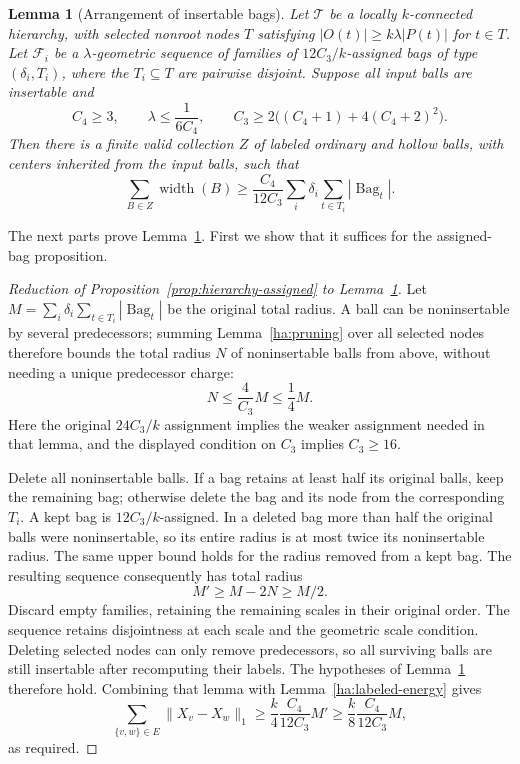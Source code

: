 \documentclass[11pt]{amsart}
\newtheorem{lemma}[theorem]{Lemma}
\theoremstyle{definition}
\theoremstyle{remark}
\numberwithin{equation}{section}
\begin{document}
\begin{lemma}[Arrangement of insertable bags]\label{ha:insertable-arrangement}
Let $\mathcal T$ be a locally $k$-connected hierarchy, with selected
nonroot nodes $T$ satisfying $|O(t)|\ge k\lambda|P(t)|$ for $t\in T$.
Let $\mathcal F_i$ be a $\lambda$-geometric sequence of families
of $12C_3/k$-assigned bags of type $(\delta_i,T_i)$, where the
$T_i\subseteq T$ are pairwise disjoint.  Suppose all input balls are
insertable and
\[
 C_4\ge3,\qquad \lambda\le\frac{1}{6C_4},\qquad
 C_3\ge2\bigl((C_4+1)+4(C_4+2)^2\bigr).
\]
Then there is a finite valid collection $Z$ of labeled ordinary and
hollow balls, with centers inherited from the input balls, such that
\begin{equation}\label{ha:arrangement-width}
 \sum_{B\in Z}\operatorname{width}(B)
 \ge \frac{C_4}{12C_3}
       \sum_i\delta_i\sum_{t\in T_i}|\operatorname{Bag}_t|.
\end{equation}
\end{lemma}

The next parts prove Lemma~\ref{ha:insertable-arrangement}.  First we
show that it suffices for the assigned-bag proposition.

\begin{proof}[Reduction of Proposition~\ref{prop:hierarchy-assigned}
to Lemma~\ref{ha:insertable-arrangement}]
Let
$M=\sum_i\delta_i\sum_{t\in T_i}|\operatorname{Bag}_t|$
be the original total radius.  A ball can be noninsertable by several
predecessors; summing Lemma~\ref{ha:pruning} over all selected nodes
therefore bounds the total radius $N$ of noninsertable balls from
above, without needing a unique predecessor charge:
\begin{equation}\label{ha:preprocess-mass}
 N\le\frac{4}{C_3}M\le\frac14M.
\end{equation}
Here the original $24C_3/k$ assignment implies the weaker assignment
needed in that lemma, and the displayed condition on $C_3$ implies
$C_3\ge16$.

Delete all noninsertable balls.  If a bag retains at least half its
original balls, keep the remaining bag; otherwise delete the bag and
its node from the corresponding $T_i$.  A kept bag is
$12C_3/k$-assigned.  In a deleted bag more than half the original
balls were noninsertable, so its entire radius is at most twice its
noninsertable radius.  The same upper bound holds for the radius
removed from a kept bag.  The resulting sequence consequently has
total radius
\[
       M'\ge M-2N\ge M/2.
\]
Discard empty families, retaining the remaining scales in their
original order. The sequence retains disjointness at each scale
and the geometric scale condition. Deleting selected nodes can only remove predecessors,
so all surviving balls are still insertable after recomputing their
labels.  The hypotheses of Lemma~\ref{ha:insertable-arrangement}
therefore hold.  Combining that lemma with
Lemma~\ref{ha:labeled-energy} gives
\[
 \sum_{\{v,w\}\in E}\|X_v-X_w\|_1
 \ge\frac{k}{4}\frac{C_4}{12C_3}M'
 \ge\frac{k}{8}\frac{C_4}{12C_3}M,
\]
as required.
\end{proof}
\end{document}
